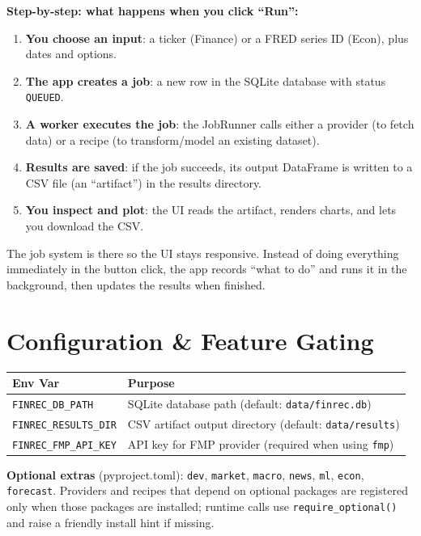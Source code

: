 \documentclass[11pt,a4paper]{article}
\begin{document}
\vspace{0.5em}
\noindent\textbf{Step-by-step: what happens when you click ``Run'':}
\begin{enumerate}[leftmargin=2.2em]
  \item \textbf{You choose an input}: a ticker (Finance) or a FRED series ID (Econ), plus dates and options.
  \item \textbf{The app creates a job}: a new row in the SQLite database with status \texttt{QUEUED}.
  \item \textbf{A worker executes the job}: the JobRunner calls either a provider (to fetch data) or a recipe (to transform/model an existing dataset).
  \item \textbf{Results are saved}: if the job succeeds, its output DataFrame is written to a CSV file (an ``artifact'') in the results directory.
  \item \textbf{You inspect and plot}: the UI reads the artifact, renders charts, and lets you download the CSV.
\end{enumerate}

\begin{intuitionbox}
The job system is there so the UI stays responsive. Instead of doing everything immediately in the button click, the app records ``what to do'' and runs it in the background, then updates the results when finished.
\end{intuitionbox}

\section{Configuration \& Feature Gating}

\begin{tabular}{@{}ll@{}}
  \toprule
  \textbf{Env Var} & \textbf{Purpose} \\
  \midrule
  \texttt{FINREC\_DB\_PATH} & SQLite database path (default: \texttt{data/finrec.db}) \\
  \texttt{FINREC\_RESULTS\_DIR} & CSV artifact output directory (default: \texttt{data/results}) \\
  \texttt{FINREC\_FMP\_API\_KEY} & API key for FMP provider (required when using \texttt{fmp}) \\
  \bottomrule
\end{tabular}

\vspace{0.5em}
\textbf{Optional extras} (pyproject.toml): \texttt{dev}, \texttt{market}, \texttt{macro}, \texttt{news}, \texttt{ml}, \texttt{econ}, \texttt{forecast}. Providers and recipes that depend on optional packages are registered only when those packages are installed; runtime calls use \texttt{require\_optional()} and raise a friendly install hint if missing.
\end{document}
